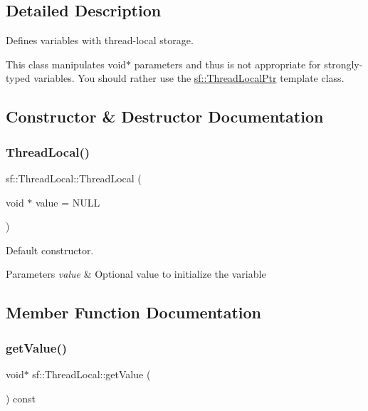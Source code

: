\subsection{Detailed Description}
Defines variables with thread-\/local storage. 

This class manipulates void$\ast$ parameters and thus is not appropriate for strongly-\/typed variables. You should rather use the \hyperlink{classsf_1_1_thread_local_ptr}{sf\+::\+Thread\+Local\+Ptr} template class. 

\subsection{Constructor \& Destructor Documentation}
\mbox{\label{classsf_1_1_thread_local_a44ea3c4be4eef118080275cbf4cf04cd}} 
\subsubsection{\texorpdfstring{Thread\+Local()}{ThreadLocal()}}
{\footnotesize\ttfamily sf\+::\+Thread\+Local\+::\+Thread\+Local (\begin{DoxyParamCaption}\item[{void $\ast$}]{value = {\ttfamily NULL} }\end{DoxyParamCaption})}



Default constructor. 


\begin{DoxyParams}{Parameters}
{\em value} & Optional value to initialize the variable \\
\hline
\end{DoxyParams}


\subsection{Member Function Documentation}
\mbox{\label{classsf_1_1_thread_local_ad68823496eb065b4b695c3468fa869bc}} 
\subsubsection{\texorpdfstring{get\+Value()}{getValue()}}
{\footnotesize\ttfamily void$\ast$ sf\+::\+Thread\+Local\+::get\+Value (\begin{DoxyParamCaption}{ }\end{DoxyParamCaption}) const}



